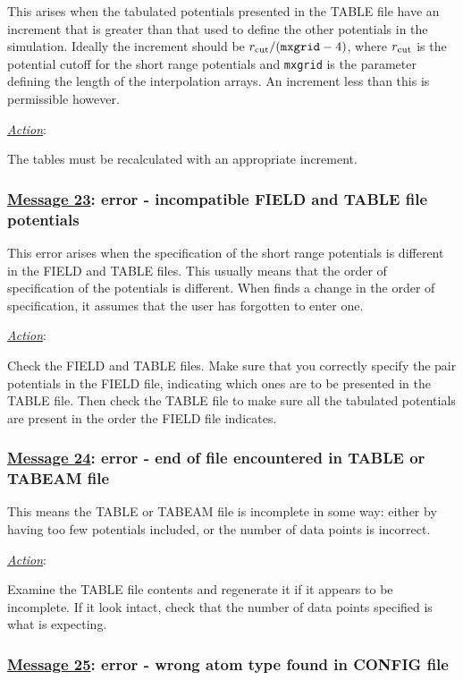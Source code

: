 This arises when the tabulated
potentials presented in the TABLE file
have an increment that is greater than that used to define the
other potentials in the simulation.  Ideally the increment should
be $r_{\rm cut}/({\tt mxgrid}-4)$, where $r_{\rm cut}$ is the
potential cutoff for the short range potentials and {\tt mxgrid}
is the parameter defining the length of the interpolation arrays.
An increment less than this is permissible however.

\noindent \underline{\em Action}:

The tables must be recalculated with an appropriate increment.

\subsubsection*{\underline{Message 23}: error - incompatible FIELD and TABLE file potentials}

This error arises when the specification of the short range
potentials is different in the FIELD and TABLE files.  This
usually means that the order of specification of the potentials is
different.  When \D finds a change in the order of specification,
it assumes that the user has forgotten to enter one.

\noindent \underline{\em Action}:

Check the FIELD and TABLE files.  Make sure that you correctly
specify the pair potentials in the FIELD file, indicating which
ones are to be presented in the TABLE file.  Then check the TABLE
file to make sure all the tabulated
potentials are present in the order the
FIELD file indicates.

\subsubsection*{\underline{Message 24}: error - end of file encountered in TABLE or TABEAM file}

This means the TABLE or TABEAM file is incomplete in some way: either by
having too few potentials included, or the number of data points
is incorrect.

\noindent \underline{\em Action}:

Examine the TABLE file contents and regenerate it if it appears to
be incomplete.  If it look intact, check that the number of data
points specified is what \D is expecting.

\subsubsection*{\underline{Message 25}: error - wrong atom type found in CONFIG file}

